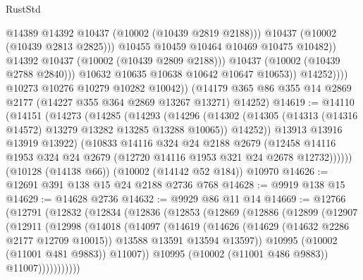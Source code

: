 \begin{lexlean}{RustStd}
\begin{coremodule}
                                @14389
                                @14392
                                @10437
                                (@10002 (@10439 @2819 @2188)))
                              @10437
                              (@10002 (@10439 @2813 @2825)))
                            @10455
                            @10459
                            @10464
                            @10469
                            @10475
                            @10482))
                        @14392
                        @10437
                        (@10002 (@10439 @2809 @2188)))
                      @10437
                      (@10002 (@10439 @2788 @2840)))
                    @10632
                    @10635
                    @10638
                    @10642
                    @10647
                    @10653))
                @14252))))
        @10273
        @10276
        @10279
        @10282
        @10042))
    (@14179 @365 @86 @355 @14 @2869 @2177 (@14227 @355 @364 @2869 @13267 @13271) @14252)
@14619 := @14110
    (@14151
      (@14273
        (@14285
          (@14293
            (@14296
              (@14302 (@14305 (@14313 (@14316 @14572) @13279 @13282 @13285 @13288 @10065)) @14252))
            @13913
            @13916
            @13919
            @13922)
          (@10833
            @14116
            @324
            @24
            @2188
            @2679
            (@12458 @14116 @1953 @324 @24 @2679 (@12720 @14116 @1953 @321 @24 @2678 @12732))))))
    (@10128 (@14138 @66))
    (@10002 (@14142 @52 @184))
    @10970
@14626 := @12691 @391 @138 @15 @24 @2188 @2736 @768
@14628 := @9919 @138 @15
@14629 := @14628 @2736
@14632 := @9929 @86 @11 @14
@14669 := @12766
    (@12791
      (@12832
        (@12834
          (@12836
            (@12853
              (@12869
                (@12886
                  (@12899
                    (@12907
                      (@12911
                        (@12998
                          (@14018
                            (@14097
                              (@14619
                                (@14626
                                  (@14629 (@14632 @2286 @2177 @12709 @10015))
                                  @13588
                                  @13591
                                  @13594
                                  @13597))
                              @10995
                              (@10002 (@11001 @481 @9883))
                              @11007))
                          @10995
                          (@10002 (@11001 @486 @9883))
                          @11007)))))))))))

\end{coremodule}
\end{lexlean}

